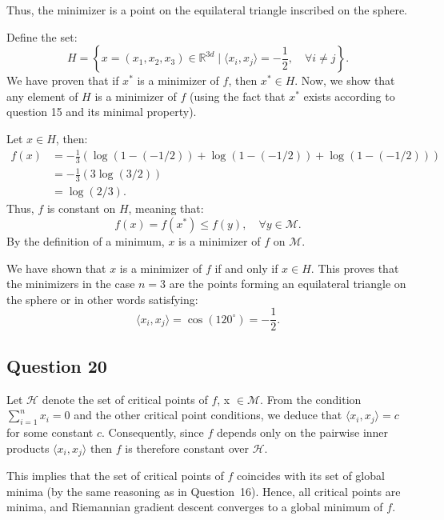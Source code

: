 \documentclass{article}
\begin{document}
Thus, the minimizer is a point on the equilateral triangle inscribed on the sphere.

Define the set:
\begin{equation}
    H = \left\{ x = (x_1, x_2, x_3) \in \mathbb{R}^{3d} \mid \langle x_i, x_j \rangle = -\frac{1}{2}, \quad \forall i \neq j \right\}.
\end{equation}
We have proven that if $x^*$ is a minimizer of $f$, then $x^* \in H$. Now, we show that any element of $H$ is a minimizer of $f$ (using the fact that $x^*$ exists according to question 15 and its minimal property).

Let $x \in H$, then:
\begin{align*}
    f(x) &= -\frac{1}{3} \left( \log(1 - (-1/2)) + \log(1 - (-1/2)) + \log(1 - (-1/2)) \right) \\
         &= -\frac{1}{3} \left( 3 \log(3/2) \right) \\
         &= \log(2/3).
\end{align*}
Thus, $f$ is constant on $H$, meaning that:
\begin{equation}
    f(x) = f(x^*) \leq f(y), \quad \forall y \in \mathcal{M}.
\end{equation}
By the definition of a minimum, $x$ is a minimizer of $f$ on $\mathcal{M}$.

We have shown that $x$ is a minimizer of $f$ if and only if $x \in H$. This proves that the minimizers in the case $n=3$ are the points forming an equilateral triangle on the sphere or in other words satisfying:
\begin{equation}
    \langle x_i, x_j \rangle = \cos(120^\circ) = -\frac{1}{2}.
\end{equation}







\subsection*{Question 20}


Let $\mathcal{H}$ denote the set of critical points of $f$, x $\in \mathcal{M}$. From the condition $\sum_{i=1}^n x_i = 0$ and the other critical point conditions, we deduce that $\langle x_i, x_j \rangle = c$ for some constant $c$. Consequently, since $f$ depends only on the pairwise inner products $\langle x_i, x_j \rangle$ then $f$ is therefore constant over $\mathcal{H}$. 

This implies that the set of critical points of $f$ coincides with its set of global minima (by the same reasoning as in Question~16). Hence, all critical points are minima, and Riemannian gradient descent converges to a global minimum of $f$.
\end{document}
